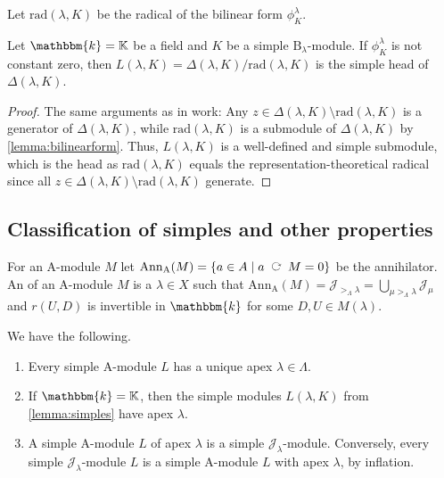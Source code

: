 \documentclass[a4paper,11pt]{amsart}
\let\emph\relax
\newcommand{\actsleft}{\mathop{\,\;\raisebox{1.7ex}{\rotatebox{-90}{$\circlearrowright$}}\;\,}}
\newcommand{\setstuff}[1]{\mathrm{#1}}
\newcommand{\K}{\mathbb{K}}
\newcommand{\KK}{\mathbbm{k}}
\numberwithin{equation}{section}
\let\fullref\autoref
\begin{document}
Let $\mathrm{rad}(\lambda,K)$ be the radical of the 
bilinear form $\phi^{\lambda}_{K}$.

\begin{lemma}\label{lemma:simples}
Let $\KK=\K$ be a field and $K$ be a simple 
$\setstuff{B}_{\lambda}$-module.
If $\phi^{\lambda}_{K}$ is not constant zero, then
$L(\lambda,K)=\Delta(\lambda,K)/\mathrm{rad}(\lambda,K)$ is 
the simple head of $\Delta(\lambda,K)$.
\end{lemma}

\begin{proof}
The same arguments as in \cite[Section 3A]{EhTu-relcell} work: 
Any $z\in\Delta(\lambda,K)\setminus\mathrm{rad}(\lambda,K)$ is a generator 
of $\Delta(\lambda,K)$, while $\mathrm{rad}(\lambda,K)$ is a submodule 
of $\Delta(\lambda,K)$ by \fullref{lemma:bilinearform}. 
Thus, $L(\lambda,K)$ is a well-defined and 
simple submodule, which is the head as $\mathrm{rad}(\lambda,K)$ equals 
the representation-theoretical radical since all 
$z\in\Delta(\lambda,K)\setminus\mathrm{rad}(\lambda,K)$ generate.
\end{proof}

\subsection{Classification of simples and other properties}\label{subsection:simples}

For an $\setstuff{A}$-module $M$ let 
$\mathrm{Ann}_{\setstuff{A}}(M)=
\{a\in A\mid a\actsleft M=0\}$ be the annihilator.
An \emph{apex} of an $\setstuff{A}$-module $M$ 
is a $\lambda\in X$ such that 
$\mathrm{Ann}_{\setstuff{A}}(M)=
\mathcal{J}_{{>_{\Lambda}}\lambda}=
\bigcup_{\mu>_{\Lambda}\lambda}\mathcal{J}_{\mu}$ 
and $r(U,D)$ is invertible in $\KK$ for some $D,U\in M(\lambda)$.

\begin{lemma}\label{lemma:apex}
We have the following.

\begin{enumerate}

\item Every simple $\setstuff{A}$-module $L$ has a unique apex 
$\lambda\in\Lambda$.

\item If $\KK=\K$, then the simple modules $L(\lambda,K)$ 
from \fullref{lemma:simples}
have apex $\lambda$.

\item A simple $\setstuff{A}$-module $L$ of apex $\lambda$ is a 
simple $\mathcal{J}_{\lambda}$-module. Conversely, 
every simple $\mathcal{J}_{\lambda}$-module $L$ is a simple 
$\setstuff{A}$-module $L$ with apex $\lambda$, by inflation.

\end{enumerate}
\end{lemma}
\end{document}
